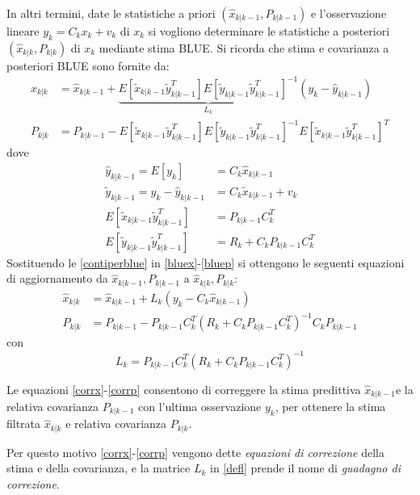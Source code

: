 In altri termini, date le statistiche a priori $(\hat{x}_{k|k-1},P_{k|k-1})$ e l’osservazione lineare $y_k=C_kx_k+v_k$ di $x_k$ si vogliono determinare le statistiche a posteriori $(\hat{x}_{k|k},P_{k|k})$ di $x_k$ mediante stima BLUE. Si ricorda che stima e covarianza a posteriori BLUE sono fornite da:
\begin{align}
\label{bluex}
\hat{x}_{k|k}&=\hat{x}_{k|k-1}+\underbrace{E[\tilde{x}_{k|k-1}\tilde{y}_{k|k-1}^T]E[\tilde{y}_{k|k-1}\tilde{y}_{k|k-1}^T]^{-1}}_{L_k}(y_k-\hat{y}_{k|k-1})\\
\label{bluep}
P_{k|k}&=P_{k|k-1}-E[\tilde{x}_{k|k-1}\tilde{y}_{k|k-1}^T]E[\tilde{y}_{k|k-1}\tilde{y}_{k|k-1}^T]^{-1}E[\tilde{x}_{k|k-1}\tilde{y}_{k|k-1}^T]^T
\end{align}
dove
\begin{equation}
\label{contiperblue}
\begin{split}
\hat{y}_{k|k-1} = E[y_k] &=C_k\hat{x}_{k|k-1} \\
\tilde{y}_{k|k-1} = y_k-\hat{y}_{k|k-1} &=C_k\tilde{x}_{k|k-1}+v_k\\
E[\tilde{x}_{k|k-1}\tilde{y}_{k|k-1}^T] &=P_{k|k-1}C_k^T\\
E[\tilde{y}_{k|k-1}\tilde{y}_{k|k-1}^T] &=R_k+C_kP_{k|k-1}C_k^T
\end{split}
\end{equation}
Sostituendo le \eqref{contiperblue} in \eqref{bluex}-\eqref{bluep} si ottengono le seguenti equazioni di aggiornamento da $\hat{x}_{k|k-1},P_{k|k-1}$ a $\hat{x}_{k|k},P_{k|k}$:
\begin{align}
\label{corrx}
\hat{x}_{k|k}&=\hat{x}_{k|k-1}+L_k(y_k-C_k\hat{x}_{k|k-1})\\
\label{corrp}
P_{k|k}&=P_{k|k-1}-P_{k|k-1}C_k^T(R_k+C_kP_{k|k-1}C_k^T)^{-1}C_kP_{k|k-1}
\end{align}
con
\begin{equation}
\label{defl}
L_k=P_{k|k-1}C_k^T(R_k+C_kP_{k|k-1}C_k^T)^{-1}
\end{equation}

Le equazioni \eqref{corrx}-\eqref{corrp} consentono di correggere la stima predittiva $\hat{x}_{k|k-1} $e la relativa covarianza $P_{k|k-1} $ con l’ultima osservazione $y_k $, per ottenere la stima filtrata $\hat{x}_{k|k} $ e relativa covarianza $P_{k|k} $.

Per questo motivo \eqref{corrx}-\eqref{corrp} vengono dette \textit{equazioni di correzione} della stima e della covarianza, e la matrice $L_k$ in \eqref{defl} prende il nome di \textit{guadagno di correzione}.

